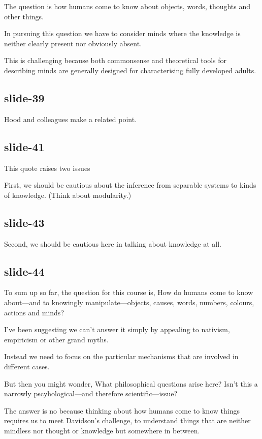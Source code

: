 \documentclass[12pt,\papersize]{extarticle}
\begin{document}
The question is how humans come to know about objects, words, thoughts and other things.
 
In pursuing this question we have to consider minds where the knowledge is neither clearly present nor obviously absent.
 
This is challenging because both commonsense and theoretical tools for describing minds are generally designed for characterising fully developed adults.
 
 
 
\subsection{slide-39}
Hood and colleagues make a related point.
 
 
 
\subsection{slide-41}
This quote raises two issues
 
First, we should be cautious about the inference from separable systems to kinds of knowledge. (Think about modularity.)
 
 
 
\subsection{slide-43}
Second, we should be cautious here in talking about knowledge at all.
 
 
 
\subsection{slide-44}
To sum up so far, the question for this course is, How do humans come to know about---and to knowingly manipulate---objects, causes, words, numbers, colours, actions and minds?
 
I've been suggesting we can't answer it simply by appealing to nativism, empiricism or other grand myths.
 
Instead we need to focus on the particular mechanisms that are involved in different cases.
 
But then you might wonder, What philosophical questions arise here? Isn't this a narrowly pscyhological---and therefore scientific---issue?
 
The answer is no because thinking about how humans come to know things requires us to meet Davidson's challenge, to understand things that are neither mindless nor thought or knowledge but somewhere in between.
 
\end{document}
